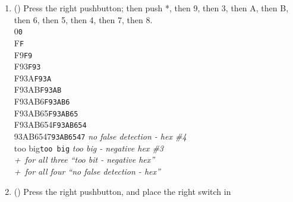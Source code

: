 \begin{enumerate}
    {\dviiseg           F23AB654}\hspace{1cm}\texttt{F23AB654}\hspace{1cm}
    \textit{no false detection - hex \#3} \\
    {\dviiseg \phantom{0}too big}\hspace{1cm}\texttt{too big}\hspace{1cm}
    \textit{too big - negative hex \#2}
\item (\phantom{xxx}) Press the right pushbutton; then push *, then 9, then 3, then A, then B, then 6, then 5, then 4, then 7, then 8. \\
    {\dviiseg \phantom{0000000}0}\hspace{1cm}\texttt{0} \\
    {\dviiseg \phantom{0000000}F}\hspace{1cm}\texttt{F} \\
    {\dviiseg \phantom{000000}F9}\hspace{1cm}\texttt{F9} \\
    {\dviiseg \phantom{00000}F93}\hspace{1cm}\texttt{F93} \\
    {\dviiseg \phantom{0000}F93A}\hspace{1cm}\texttt{F93A} \\
    {\dviiseg \phantom{000}F93AB}\hspace{1cm}\texttt{F93AB} \\
    {\dviiseg \phantom{00}F93AB6}\hspace{1cm}\texttt{F93AB6} \\
    {\dviiseg \phantom{0}F93AB65}\hspace{1cm}\texttt{F93AB65} \\
    {\dviiseg           F93AB654}\hspace{1cm}\texttt{F93AB654} \\
    {\dviiseg           93AB6547}\hspace{1cm}\texttt{93AB6547}\hspace{1cm}
    \textit{no false detection - hex \#4} \\
    {\dviiseg \phantom{0}too big}\hspace{1cm}\texttt{too big}\hspace{1cm}
    \textit{too big - negative hex \#3} \\
    \textit{+\textonequarter\ for all three ``too bit - negative hex''} \\
    \textit{+\textonequarter\ for all four ``no false detection - hex''}
\item (\phantom{xxx}) Press the right pushbutton, and place the right switch in

\end{enumerate}
